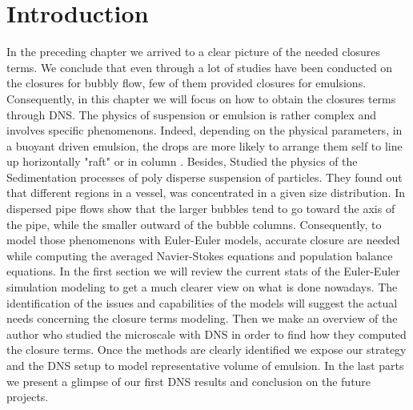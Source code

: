\section{Introduction}
    

In the preceding chapter we arrived to a clear picture of the needed closures terms.
We conclude that even through a lot of studies have been conducted on the closures for bubbly flow, few of them provided closures for emulsions.
Consequently, in this chapter we will focus on how to obtain the closures terms through DNS. 
The physics of suspension or emulsion is rather complex and involves specific phenomenons.
Indeed, depending on the physical parameters, in a buoyant driven emulsion, the drops are more likely to arrange them self to line up horizontally "raft" or in column \citep{tryggvason2011direct} \citep{guazzelli2011}. 
Besides, \citet{davis1985sedimentation} Studied the physics of the Sedimentation processes of poly disperse suspension of particles. 
They found out that different regions in a vessel, was concentrated in a given size distribution.
In dispersed pipe flows \citet{morel2010comparison} show that the larger bubbles tend to go toward the axis of the pipe, while the smaller outward of the bubble columns.
Consequently, to model those phenomenons with Euler-Euler models, accurate closure are needed while computing the averaged Navier-Stokes equations and population balance equations.
In the first section we will review the current stats of the Euler-Euler simulation modeling to get a much clearer view on what is done nowadays.
The identification of the issues and capabilities of the models will suggest the actual needs concerning the closure terms modeling.
Then we make an overview of the author who studied the microscale with DNS in order to find how they computed the closure terms.
Once the methods are clearly identified we expose our strategy and the DNS setup to model representative volume of emulsion. 
In the last parts we present a glimpse of our first DNS results and conclusion on the future projects. 

